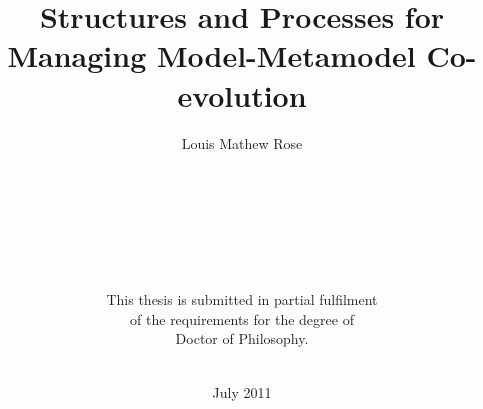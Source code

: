 \title{Structures and Processes for Managing Model-Metamodel Co-evolution}
\author{Louis Mathew Rose \\ \\
\\ \\ \\ \\ \\ \\
This thesis is submitted in partial fulfilment \\
of the requirements for the degree of \\
Doctor of Philosophy. \\ \\}
\date{July 2011}
